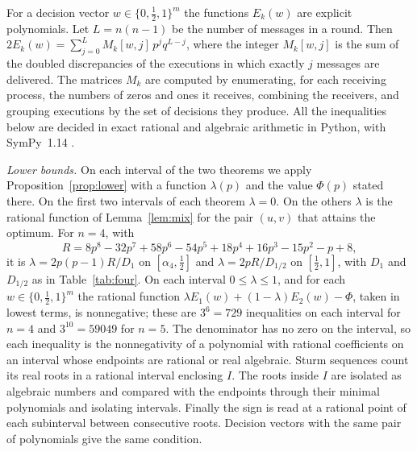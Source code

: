 \documentclass[11pt]{article}
\newcommand{\h}{\tfrac12}
\begin{document}
For a decision vector $w\in\{0,\h,1\}^m$ the functions $E_k(w)$ are explicit polynomials. Let $L=n(n-1)$ be the number of messages in a round. Then $2E_k(w)=\sum_{j=0}^{L}M_k[w,j]\,p^jq^{L-j}$, where the integer $M_k[w,j]$ is the sum of the doubled discrepancies of the executions in which exactly $j$ messages are delivered. The matrices $M_k$ are computed by enumerating, for each receiving process, the numbers of zeros and ones it receives, combining the receivers, and grouping executions by the set of decisions they produce. All the inequalities below are decided in exact rational and algebraic arithmetic in Python, with SymPy~1.14 \cite{SymPy}.

\emph{Lower bounds.} On each interval of the two theorems we apply Proposition~\ref{prop:lower} with a function $\lambda(p)$ and the value $\Phi(p)$ stated there. On the first two intervals of each theorem $\lambda=0$. On the others $\lambda$ is the rational function of Lemma~\ref{lem:mix} for the pair $(u,v)$ that attains the optimum. For $n=4$, with
\[
R=8p^8-32p^7+58p^6-54p^5+18p^4+16p^3-15p^2-p+8,
\]
it is $\lambda=2p(p-1)R/D_1$ on $[\alpha_4,\h]$ and $\lambda=2pR/D_{1/2}$ on $[\h,1]$, with $D_1$ and $D_{1/2}$ as in Table~\ref{tab:four}. On each interval $0\le\lambda\le1$, and for each $w\in\{0,\h,1\}^m$ the rational function $\lambda E_1(w)+(1-\lambda)E_2(w)-\Phi$, taken in lowest terms, is nonnegative; these are $3^6=729$ inequalities on each interval for $n=4$ and $3^{10}=59049$ for $n=5$. The denominator has no zero on the interval, so each inequality is the nonnegativity of a polynomial with rational coefficients on an interval whose endpoints are rational or real algebraic. Sturm sequences count its real roots in a rational interval enclosing $I$. The roots inside $I$ are isolated as algebraic numbers and compared with the endpoints through their minimal polynomials and isolating intervals. Finally the sign is read at a rational point of each subinterval between consecutive roots. Decision vectors with the same pair of polynomials give the same condition.
\end{document}
